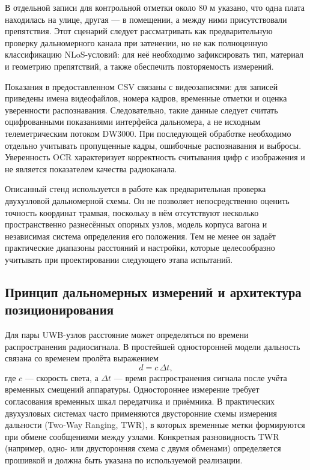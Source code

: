 \documentclass{misisarticle}
\begin{document}
В отдельной записи для контрольной отметки около 80 м указано, что одна плата находилась на улице, другая — в помещении, а между ними присутствовали препятствия. Этот сценарий следует рассматривать как предварительную проверку дальномерного канала при затенении, но не как полноценную классификацию NLoS-условий: для неё необходимо зафиксировать тип, материал и геометрию препятствий, а также обеспечить повторяемость измерений.

Показания в предоставленном CSV связаны с видеозаписями: для записей приведены имена видеофайлов, номера кадров, временные отметки и оценка уверенности распознавания. Следовательно, такие данные следует считать оцифрованными показаниями интерфейса дальномера, а не исходным телеметрическим потоком DW3000. При последующей обработке необходимо отдельно учитывать пропущенные кадры, ошибочные распознавания и выбросы. Уверенность OCR характеризует корректность считывания цифр с изображения и не является показателем качества радиоканала.

Описанный стенд используется в работе как предварительная проверка двухузловой дальномерной схемы. Он не позволяет непосредственно оценить точность координат трамвая, поскольку в нём отсутствуют несколько пространственно разнесённых опорных узлов, модель корпуса вагона и независимая система определения его положения. Тем не менее он задаёт практические диапазоны расстояний и настройки, которые целесообразно учитывать при проектировании следующего этапа испытаний.

\subsection{Принцип дальномерных измерений и архитектура позиционирования}

Для пары UWB-узлов расстояние может определяться по времени распространения радиосигнала. В простейшей односторонней модели дальность связана со временем пролёта выражением
\begin{equation}
    d=c\,\Delta t,
\end{equation}
где \(c\) — скорость света, а \(\Delta t\) — время распространения сигнала после учёта временных смещений аппаратуры. Одностороннее измерение требует согласования временных шкал передатчика и приёмника. В практических двухузловых системах часто применяются двусторонние схемы измерения дальности (Two-Way Ranging, TWR), в которых временные метки формируются при обмене сообщениями между узлами. Конкретная разновидность TWR (например, одно- или двусторонняя схема с двумя обменами) определяется прошивкой и должна быть указана по используемой реализации.
\end{document}
